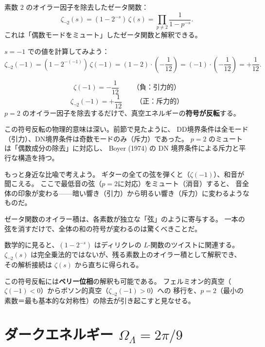 \documentclass[11pt,a4paper]{article}
\theoremstyle{definition}
\begin{document}
\begin{dfnbox}[定義: $p=2$ ミュートゼータ]
素数 $2$ のオイラー因子を除去したゼータ関数：
\[
  \zeta_{\neg 2}(s) = (1 - 2^{-s})\,\zeta(s)
                    = \prod_{p\neq 2} \frac{1}{1-p^{-s}}.
\]
これは「偶数モードをミュート」したゼータ関数と解釈できる。
\end{dfnbox}

$s = -1$ での値を計算してみよう：
\[
  \zeta_{\neg 2}(-1) = (1 - 2^{-(-1)})\,\zeta(-1)
                     = (1 - 2)\cdot\left(-\frac{1}{12}\right)
                     = (-1)\cdot\left(-\frac{1}{12}\right)
                     = +\frac{1}{12}.
\]

\begin{keybox}[符号反転]
\[
  \zeta(-1) = -\frac{1}{12} \qquad\text{（負：引力的）}
\]
\[
  \zeta_{\neg 2}(-1) = +\frac{1}{12} \qquad\text{（正：斥力的）}
\]
$p=2$ のオイラー因子を除去するだけで、真空エネルギーの\textbf{符号が反転}する。
\end{keybox}

この符号反転の物理的意味は深い。前節で見たように、
DD境界条件は全モード（引力）、DN境界条件は奇数モードのみ（斥力）であった。
$p=2$ のミュートは「偶数成分の除去」に対応し、
Boyer (1974) の DN 境界条件による斥力と平行な構造を持つ。

\begin{hsbox}
もっと身近な比喩で考えよう。
ギターの全ての弦を弾くと（$\zeta(-1)$）、和音が聞こえる。
ここで最低音の弦（$p=2$に対応）をミュート（消音）すると、
音全体の印象が変わる——暗い響き（引力）から明るい響き（斥力）に変わるようなものだ。

ゼータ関数のオイラー積は、各素数が独立な「弦」のように寄与する。
一本の弦を消すだけで、全体の和の符号が変わるのは驚くべきことだ。
\end{hsbox}

数学的に見ると、$(1 - 2^{-s})$ はディリクレの $L$-関数のツイストに関連する。
$\zeta_{\neg 2}(s)$ は完全乗法的ではないが、残る素数上のオイラー積として解釈でき、
その解析接続は $\zeta(s)$ から直ちに得られる。

この符号反転には\textbf{ベリー位相}の解釈も可能である。
フェルミオン的真空（$\zeta(-1) < 0$）からボソン的真空（$\zeta_{\neg 2}(-1) > 0$）への
移行を、$p=2$（最小の素数＝最も基本的な対称性）の除去が引き起こすと見なせる。

\section{ダークエネルギー $\Omega_\Lambda = 2\pi/9$}
\label{sec:4.4}
\end{document}
